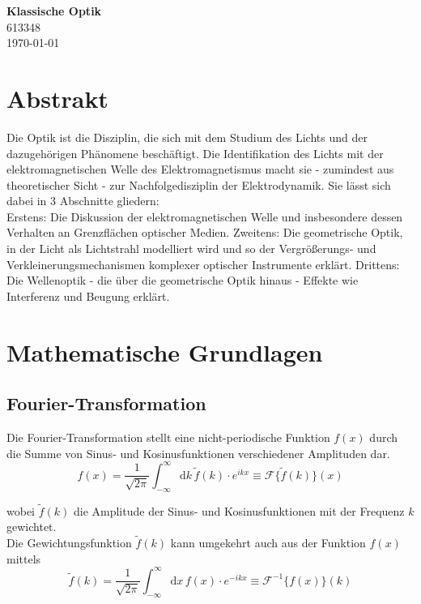 \documentclass{article}
\newcommand{\diff}{\mathrm{d}}
\begin{document}
\begin{center}
	\Large{\textbf{Klassische Optik}}\\
	\small{613348}\\
	\small{\today}
\end{center}

\tableofcontents


\newpage


\section*{Abstrakt}
Die Optik ist die Disziplin, die sich mit dem Studium des Lichts und der dazugehörigen Phänomene beschäftigt. Die Identifikation des Lichts mit der elektromagnetischen Welle des Elektromagnetismus macht sie - zumindest aus theoretischer Sicht - zur Nachfolgedisziplin der Elektrodynamik. Sie lässt sich dabei in 3 Abschnitte gliedern:\\
Erstens: Die Diskussion der elektromagnetischen Welle und insbesondere dessen Verhalten an Grenzflächen optischer Medien. Zweitens: Die geometrische Optik, in der Licht als Lichtstrahl modelliert wird und so der Vergrößerungs- und Verkleinerungsmechanismen komplexer optischer Instrumente erklärt. Drittens: Die Wellenoptik - die über die geometrische Optik hinaus - Effekte wie Interferenz und Beugung erklärt.






\newpage


\section{Mathematische Grundlagen}
\subsection{Fourier-Transformation}
Die Fourier-Transformation stellt eine nicht-periodische Funktion $f(x)$ durch die Summe von Sinus- und Kosinusfunktionen verschiedener Amplituden dar.
	\begin{equation}
		f(x) = \frac{1}{\sqrt{2\pi}} \int_{-\infty}^{\infty} \diff k\, \tilde{f}(k) \cdot e^{ikx} \equiv \mathcal{F}\{\tilde{f}(k)\}(x)
	\end{equation}

wobei $\tilde{f}(k)$ die Amplitude der Sinus- und Kosinusfunktionen mit der Frequenz $k$ gewichtet.\\
Die Gewichtungsfunktion $\tilde{f}(k)$ kann umgekehrt auch aus der Funktion $f(x)$ mittels
	\begin{equation}
		\tilde{f}(k) = \frac{1}{\sqrt{2\pi}} \int_{-\infty}^{\infty} \diff x\, f(x)\cdot e^{-ikx} \equiv \mathcal{F}^{-1}\{f(x)\}(k)
	\end{equation}
	
\end{document}
